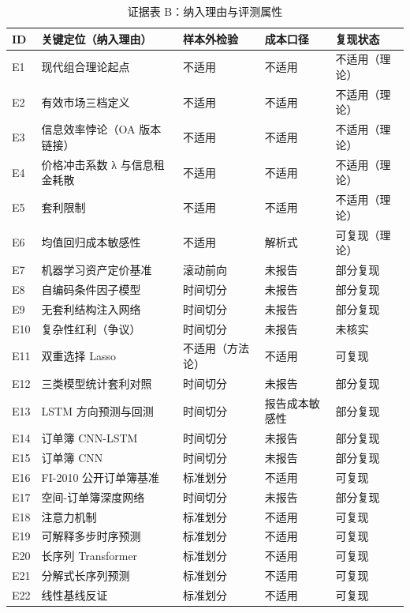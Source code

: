 {\small
\begin{xltabular}{\textwidth}{@{}>{\raggedright\arraybackslash}p{0.7cm}>{\raggedright\arraybackslash}X>{\raggedright\arraybackslash}p{2.6cm}>{\raggedright\arraybackslash}p{2.4cm}>{\raggedright\arraybackslash}p{1.8cm}@{}}
\caption{证据表 B：纳入理由与评测属性}\\
\toprule
ID & 关键定位（纳入理由） & 样本外检验 & 成本口径 & 复现状态 \\
\midrule
\endhead
E1 & 现代组合理论起点 & 不适用 & 不适用 & 不适用（理论） \\
E2 & 有效市场三档定义 & 不适用 & 不适用 & 不适用（理论） \\
E3 & 信息效率悖论（OA 版本链接） & 不适用 & 不适用 & 不适用（理论） \\
E4 & 价格冲击系数 λ 与信息租金耗散 & 不适用 & 不适用 & 不适用（理论） \\
E5 & 套利限制 & 不适用 & 不适用 & 不适用（理论） \\
E6 & 均值回归成本敏感性 & 不适用 & 解析式 & 可复现（理论） \\
E7 & 机器学习资产定价基准 & 滚动前向 & 未报告 & 部分复现 \\
E8 & 自编码条件因子模型 & 时间切分 & 未报告 & 部分复现 \\
E9 & 无套利结构注入网络 & 时间切分 & 未报告 & 部分复现 \\
E10 & 复杂性红利（争议） & 时间切分 & 未报告 & 未核实 \\
E11 & 双重选择 Lasso & 不适用（方法论） & 不适用 & 可复现 \\
E12 & 三类模型统计套利对照 & 时间切分 & 未报告 & 部分复现 \\
E13 & LSTM 方向预测与回测 & 时间切分 & 报告成本敏感性 & 部分复现 \\
E14 & 订单簿 CNN-LSTM & 时间切分 & 未报告 & 部分复现 \\
E15 & 订单簿 CNN & 时间切分 & 未报告 & 部分复现 \\
E16 & FI-2010 公开订单簿基准 & 标准划分 & 不适用 & 可复现 \\
E17 & 空间-订单簿深度网络 & 时间切分 & 未报告 & 部分复现 \\
E18 & 注意力机制 & 标准划分 & 不适用 & 可复现 \\
E19 & 可解释多步时序预测 & 标准划分 & 不适用 & 可复现 \\
E20 & 长序列 Transformer & 标准划分 & 不适用 & 可复现 \\
E21 & 分解式长序列预测 & 标准划分 & 不适用 & 可复现 \\
E22 & 线性基线反证 & 标准划分 & 不适用 & 可复现 \\

\end{xltabular}}
